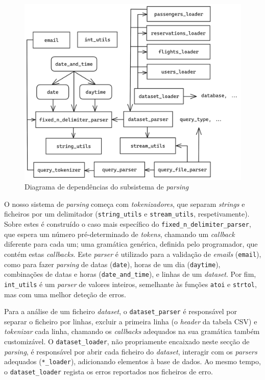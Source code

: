 \documentclass[12pt, a4paper]{article}
\begin{document}
\begin{figure}[ht]
    \centering
    \includegraphics[scale=0.17]{res/parsing.png}
    \caption{Diagrama de dependências do subsistema de \emph{parsing}}
    \label{fig:parsing}
\end{figure}

O nosso sistema de \emph{parsing} começa com \emph{tokenizadores}, que separam \emph{strings} e
ficheiros por um delimitador (\texttt{string\_utils} e \texttt{stream\_utils}, respetivamente).
Sobre estes é construído o caso mais específico do \texttt{fixed\_n\_delimiter\_parser}, que espera
um número pré-determinado de \emph{tokens}, chamando um \emph{callback} diferente para cada um; uma
gramática genérica, definida pelo programador, que contém estas \emph{callbacks}. Este \emph{parser}
é utilizado para a validação de \emph{emails} (\texttt{email}), como para fazer \emph{parsing} de datas
(\texttt{date}), horas de um dia (\texttt{daytime}), combinações de datas e horas
(\texttt{date\_and\_time}), e linhas de um \emph{dataset}. Por fim, \texttt{int\_utils} é um \emph{parser}
de valores inteiros, semelhante às funções \texttt{atoi} e \texttt{strtol}, mas com uma melhor deteção de
erros.

Para a análise de um ficheiro \emph{dataset}, o \texttt{dataset\_parser} é responsável por
separar o ficheiro por linhas, excluir a primeira linha (o \emph{header} da tabela CSV) e
\emph{tokenizar} cada linha, chamando os \emph{callbacks} adequados na sua gramática também
customizável. O \texttt{dataset\_loader}, não propriamente encaixado neste secção de
\emph{parsing}, é responsável por abrir cada ficheiro do \emph{dataset}, interagir com os
\emph{parsers} adequados (\texttt{*\_loader}), adicionando elementos à base de dados. Ao mesmo
tempo, o \texttt{dataset\_loader} regista os erros reportados nos ficheiros de erro.
\end{document}
